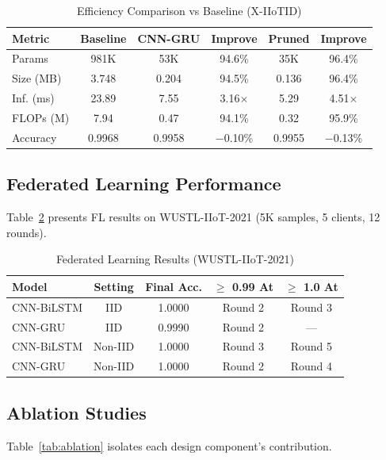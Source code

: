 \documentclass[preprint,12pt]{elsarticle}
\begin{document}
\begin{table}[hbt]
\centering
\caption{Efficiency Comparison vs Baseline (X-IIoTID)}
\label{tab:efficiency}
\begin{tabular}{lccccc}
\toprule
Metric & Baseline & CNN-GRU & Improve & Pruned & Improve \\
\midrule
Params & 981K & 53K & 94.6\% & 35K & 96.4\% \\
Size (MB) & 3.748 & 0.204 & 94.5\% & 0.136 & 96.4\% \\
Inf. (ms) & 23.89 & 7.55 & 3.16$\times$ & 5.29 & 4.51$\times$ \\
FLOPs (M) & 7.94 & 0.47 & 94.1\% & 0.32 & 95.9\% \\
Accuracy & 0.9968 & 0.9958 & $-$0.10\% & 0.9955 & $-$0.13\% \\
\bottomrule
\end{tabular}
\end{table}

\subsection{Federated Learning Performance}

Table~\ref{tab:fl} presents FL results on WUSTL-IIoT-2021 (5K samples, 5 clients, 12 rounds).

\begin{table}[hbt]
\centering
\caption{Federated Learning Results (WUSTL-IIoT-2021)}
\label{tab:fl}
\begin{tabular}{lcccc}
\toprule
Model & Setting & Final Acc. & $\ge$ 0.99 At & $\ge$ 1.0 At \\
\midrule
CNN-BiLSTM & IID & 1.0000 & Round 2 & Round 3 \\
CNN-GRU & IID & 0.9990 & Round 2 & --- \\
CNN-BiLSTM & Non-IID & 1.0000 & Round 3 & Round 5 \\
CNN-GRU & Non-IID & 1.0000 & Round 2 & Round 4 \\
\bottomrule
\end{tabular}
\end{table}

\subsection{Ablation Studies}

Table~\ref{tab:ablation} isolates each design component's contribution.
\end{document}
